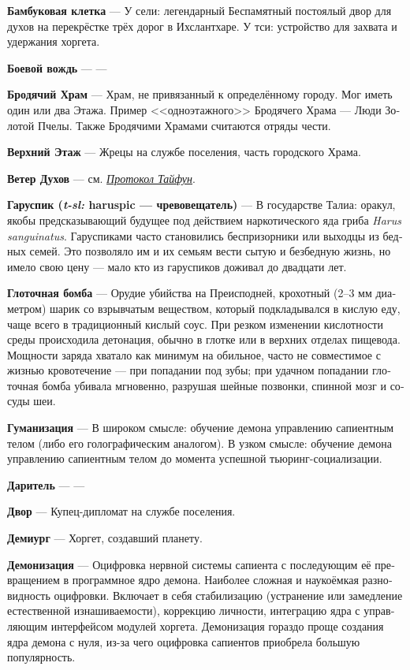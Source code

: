 \documentclass[a4paper,12pt,fleqn]{book}\usepackage{polyglossia}\setdefaultlanguage[babelshorthands=true]{russian}\setotherlanguage{english}\defaultfontfeatures{Ligatures=TeX,Mapping=tex-text}\usepackage{xcolor}\newcommand{\ml}[3]{#2}
\newcommand{\theterm}[3]{\textbf{\hypertarget{#1}{#2}} --- #3}
\newcommand{\thesynonim}[3]{\textbf{#2} --- см. \textit{\hyperlink{#1}{#3}}.}
\newcommand{\theorigin}[3]{\textit{#1:} #2 --- #3}
\begin{document}
{\theterm{bamboo-birdcage} %
{Бамбуковая клетка}
{У сели: легендарный Беспамятный постоялый двор для духов на перекрёстке трёх дорог в Ихслантхаре.
У тси: устройство для захвата и удержания хоргета.}

\theterm{warchief} %
{Боевой вождь}
{---}

\theterm{wandering-temple} %
{Бродячий Храм}
{Храм, не привязанный к определённому городу.
Мог иметь один или два Этажа.
Пример <<одноэтажного>> Бродячего Храма --- Люди Золотой Пчелы.
Также Бродячими Храмами считаются отряды чести.}

\theterm{upstairs} %
{Верхний Этаж}
{Жрецы на службе поселения, часть городского Храма.}

\thesynonim{protocol-taifeng}
{Ветер Духов}
{Протокол Тайфун}

\theterm{jaruspic}
{Гаруспик (\theorigin{t-sl}{haruspic}{чревовещатель})}
{В государстве Талиа: оракул, якобы предсказывающий будущее под действием наркотического яда гриба \textit{Harus sanguinatus}.
Гаруспиками часто становились беспризорники или выходцы из бедных семей.
Это позволяло им и их семьям вести сытую и безбедную жизнь, но имело свою цену --- мало кто из гаруспиков доживал до двадцати лет.}

\theterm{throat-bomb}
{Глоточная бомба}
{Орудие убийства на Преисподней, крохотный (2--3 мм диаметром) шарик со взрывчатым веществом, который подкладывался в кислую еду, чаще всего в традиционный кислый соус.
При резком изменении кислотности среды происходила детонация, обычно в глотке или в верхних отделах пищевода.
Мощности заряда хватало как минимум на обильное, часто не совместимое с жизнью кровотечение --- при попадании под зубы;
при удачном попадании глоточная бомба убивала мгновенно, разрушая шейные позвонки, спинной мозг и сосуды шеи.}

\theterm{humanization}
{Гуманизация}
{В широком смысле: обучение демона управлению сапиентным телом (либо его голографическим аналогом). В узком смысле: обучение демона управлению сапиентным телом до момента успешной тьюринг-социализации.}

\theterm{giver} %
{Даритель}
{---}

\theterm{house} %
{Двор}
{Купец-дипломат на службе поселения.}

\theterm{demiurge} %
{Демиург}
{Хоргет, создавший планету.}

\theterm{daemonization}
{Демонизация}
{Оцифровка нервной системы сапиента с последующим её превращением в программное ядро демона.
Наиболее сложная и наукоёмкая разновидность оцифровки.
Включает в себя стабилизацию (устранение или замедление естественной изнашиваемости), коррекцию личности, интеграцию ядра с управляющим интерфейсом модулей хоргета.
Демонизация гораздо проще создания ядра демона с нуля, из-за чего оцифровка сапиентов приобрела большую популярность.}

}
\end{document}
